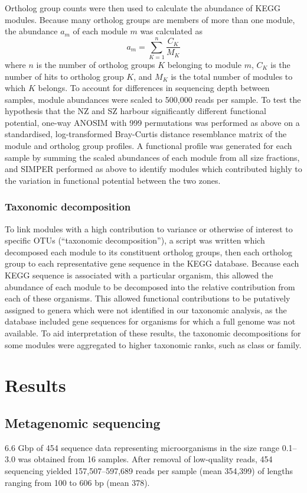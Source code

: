 Ortholog group counts were then used to calculate the abundance of KEGG modules.
Because many ortholog groups are members of more than one module, the abundance $a_m$ of each module $m$ was calculated as 
\[
a_{m}=\sum_{K=1}^{n}\frac{C_{K}}{M_K}
\]
where $n$ is the number of ortholog groups $K$ belonging to module $m$, $C_{K}$ is the number of hits to ortholog group $K$, and $M_{K}$ is the total number of modules to which $K$ belongs.
To account for differences in sequencing depth between samples, module abundances were scaled to 500,000 reads per sample. 
To test the hypothesis that the \ac{NZ} and \ac{SZ} harbour significantly different functional potential, one-way \ac{ANOSIM} with 999 permutations was performed as above on a standardised, log-transformed Bray-Curtis distance resemblance matrix of the module and ortholog group profiles. 
A functional profile was generated for each sample by summing the scaled abundances of each module from all size fractions, and \ac{SIMPER} performed as above to identify modules which contributed highly to the variation in functional potential between the two zones. 

\subsubsection{Taxonomic decomposition}

To link modules with a high contribution to variance or otherwise of interest to specific \acp{OTU} (``taxonomic decomposition''), a script was written which decomposed each module to its constituent ortholog groups, then each ortholog group to each representative gene sequence in the \ac{KEGG} database.
Because each \ac{KEGG} sequence is associated with a particular organism, this allowed the abundance of each module to be decomposed into the relative contribution from each of these organisms.
This allowed functional contributions to be putatively assigned to genera which were not identified in our taxonomic analysis, as the database included gene sequences for organisms for which a full genome was not available.
To aid interpretation of these results, the taxonomic decompositions for some modules were aggregated to higher taxonomic ranks, such as class or family.

\section{Results}

\subsection{Metagenomic sequencing}
6.6 Gbp of 454 sequence data representing microorganisms in the size range 0.1--3.0 \micron{} was obtained from 16 samples. 
After removal of low-quality reads, 454 sequencing yielded 157,507--597,689 reads per sample (mean 354,399) of lengths ranging from 100 to 606 bp (mean 378).

